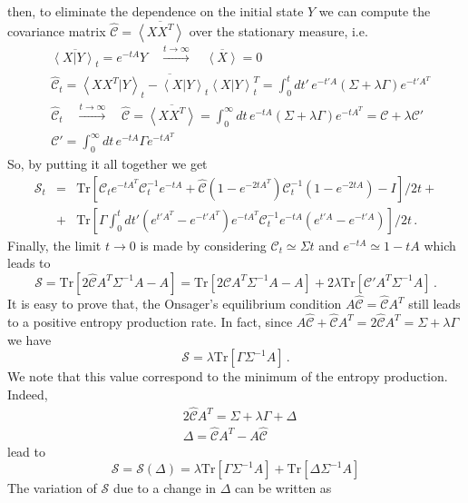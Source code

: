 \documentclass[12pt]{iopart}
\newcommand{\lx} {\left}
\newcommand{\rx} {\right}
\newcommand{\ave}[1] {\lx\langle #1 \rx\rangle}
\newcommand{\cS} {\mathcal{S}}
\newcommand{\cC} {\mathcal{C}}
\begin{document}
then, to eliminate the dependence on the initial state $Y$ we can compute the covariance matrix $\widehat{\cC} = \overline{\ave{XX^T}}$ over the stationary measure, i.e.
\begin{eqnarray}
    &\overline{\ave{X|Y}_t} = e^{-tA} Y \quad \overset{t\to\infty}{\longrightarrow} \quad \overline{\ave{X}} = 0 \\
    &\widehat{\cC}_t =\overline{\ave{XX^T|Y}_t - \ave{X|Y}_t \ave{X|Y}_t^T} = \int_0^t dt' \, e^{-t'A} \lx(\Sigma + \lambda \Gamma \rx) e^{-t' A^T} \\
    &\widehat{\cC}_t \quad \overset{t\to\infty}{\longrightarrow} \quad \widehat{\cC} = \overline{\ave{XX^T}} = \int_0^\infty dt \, e^{-tA} \lx(\Sigma + \lambda \Gamma \rx) e^{-t A^T} = \cC + \lambda \cC'\\
    &\cC' =  \int_0^\infty dt \, e^{-tA} \Gamma e^{-t A^T}
\end{eqnarray}
So, by putting it all together we get
\begin{eqnarray}
    \cS_t &=& \text{Tr}\lx[\cC_t e^{-tA^T} \cC_t^{-1} e^{-tA} + \widehat{\cC} (1-e^{-2tA^T})\cC_t^{-1} (1-e^{-2tA}) - I\rx]/2t+ \nonumber\\
    &+& \text{Tr}\lx[\Gamma \int_0^t dt' \lx(e^{t'A^T}-e^{-t'A^T}\rx) e^{-t A^T}\cC_t^{-1}e^{-t A}\lx(e^{t' A}-e^{-t' A}\rx)\rx] /2t\,.
\end{eqnarray}
Finally, the limit $t \to 0$ is made by considering $\cC_t \simeq \Sigma t$
and $e^{-tA}\simeq 1 - tA$ which leads to
\begin{equation}
    \cS = \text{Tr}\lx[2 \widehat{\cC}A^T \Sigma^{-1}A - A \rx] = 
     \text{Tr}\lx[2 \cC A^T \Sigma^{-1}A - A \rx] + 2\lambda \text{Tr} \lx[ \cC' A^T \Sigma^{-1} A \rx]\,.
\end{equation}
It is easy to prove that, the Onsager's equilibrium condition $A\widehat{\cC}=\widehat{\cC}A^T$ still leads to a positive entropy production rate.
In fact, since $A\widehat{\cC}+ \widehat{\cC}A^T=2\widehat{\cC}A^T=\Sigma+\lambda \Gamma$ we have
\begin{equation}
\cS = \lambda \text{Tr}\lx[\Gamma \Sigma^{-1}A\rx]\,.
\end{equation}
We note that this value correspond to the minimum of the entropy production. Indeed, 
\begin{align}
    &2\widehat{\cC}A^T=\Sigma+\lambda \Gamma+\Delta\,\\
    &\Delta = \widehat{\cC}A^T-A\widehat{\cC}
\end{align}
lead to
\begin{equation}
\cS = \cS(\Delta)= \lambda \text{Tr}\lx[\Gamma \Sigma^{-1}A\rx] + \text{Tr}\lx[\Delta \Sigma^{-1}A\rx]
\end{equation}
The variation of $\cS$ due to a change in $\Delta$ can be written as
\end{document}

